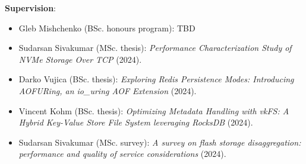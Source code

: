 \documentclass[letterpaper,11pt]{article}
\begin{document}
\textbf{Supervision}:
\begin{itemize}
\itemsep0em
  \item Gleb Mishchenko  (BSc. honours program):  TBD
  
  \item Sudarsan Sivakumar (MSc. thesis): 
  \textit{Performance Characterization Study of NVMe Storage Over TCP} (2024).
  
  \item Darko Vujica (BSc. thesis): 
  \textit{Exploring Redis Persistence Modes: Introducing AOFURing, an io\_uring AOF Extension} (2024).
  
  \item Vincent Kohm (BSc. thesis): 
  \textit{Optimizing Metadata Handling with vkFS: A Hybrid Key-Value Store File System leveraging RocksDB} (2024).
  
  \item Sudarsan Sivakumar (MSc. survey): 
  \textit{A survey on flash storage disaggregation: performance and quality of service considerations} (2024).
\end{itemize}

%


\end{document}
